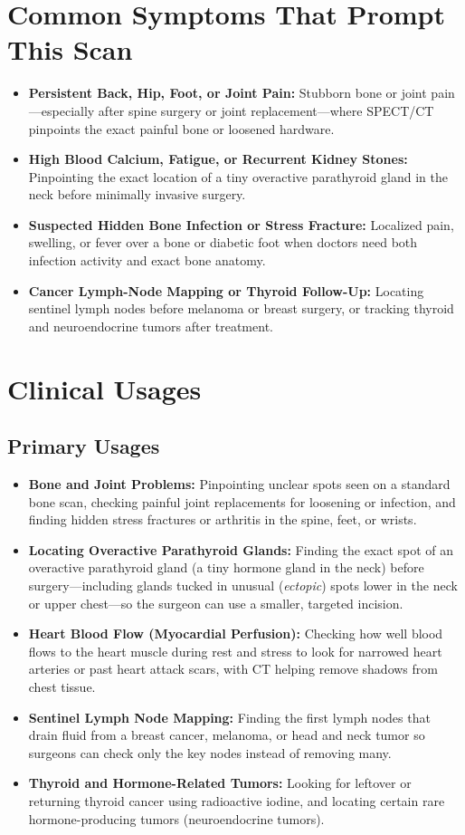 \section{Common Symptoms That Prompt This Scan}
\begin{itemize}
    \item \textbf{Persistent Back, Hip, Foot, or Joint Pain:} Stubborn bone or joint pain---especially after spine surgery or joint replacement---where SPECT/CT pinpoints the exact painful bone or loosened hardware.
    \item \textbf{High Blood Calcium, Fatigue, or Recurrent Kidney Stones:} Pinpointing the exact location of a tiny overactive parathyroid gland in the neck before minimally invasive surgery.
    \item \textbf{Suspected Hidden Bone Infection or Stress Fracture:} Localized pain, swelling, or fever over a bone or diabetic foot when doctors need both infection activity and exact bone anatomy.
    \item \textbf{Cancer Lymph-Node Mapping or Thyroid Follow-Up:} Locating sentinel lymph nodes before melanoma or breast surgery, or tracking thyroid and neuroendocrine tumors after treatment.
\end{itemize}

\section{Clinical Usages}

\subsection{Primary Usages}
\begin{itemize}
    \item \textbf{Bone and Joint Problems:} Pinpointing unclear spots seen on a standard bone scan, checking painful joint replacements for loosening or infection, and finding hidden stress fractures or arthritis in the spine, feet, or wrists.
    \item \textbf{Locating Overactive Parathyroid Glands:} Finding the exact spot of an overactive parathyroid gland (a tiny hormone gland in the neck) before surgery---including glands tucked in unusual (\textit{ectopic}) spots lower in the neck or upper chest---so the surgeon can use a smaller, targeted incision.
    \item \textbf{Heart Blood Flow (Myocardial Perfusion):} Checking how well blood flows to the heart muscle during rest and stress to look for narrowed heart arteries or past heart attack scars, with CT helping remove shadows from chest tissue.
    \item \textbf{Sentinel Lymph Node Mapping:} Finding the first lymph nodes that drain fluid from a breast cancer, melanoma, or head and neck tumor so surgeons can check only the key nodes instead of removing many.
    \item \textbf{Thyroid and Hormone-Related Tumors:} Looking for leftover or returning thyroid cancer using radioactive iodine, and locating certain rare hormone-producing tumors (neuroendocrine tumors).
\end{itemize}

